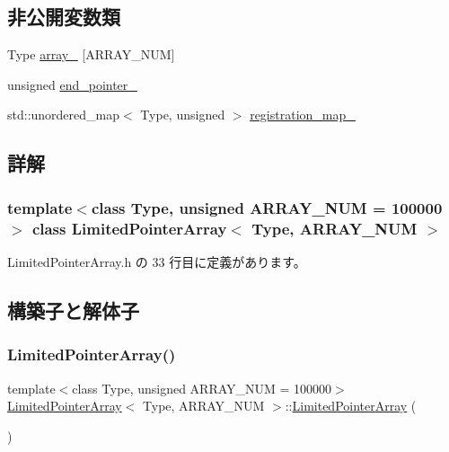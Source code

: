 \subsection*{非公開変数類}
\begin{DoxyCompactItemize}
\item 
Type \mbox{\hyperlink{class_limited_pointer_array_a80e958d7818fc6ee0e757b56abc937a4}{array\+\_\+}} \mbox{[}A\+R\+R\+A\+Y\+\_\+\+N\+UM\mbox{]}
\item 
unsigned \mbox{\hyperlink{class_limited_pointer_array_a7da38a8f2ea9a4b030f64f0e8adc27e8}{end\+\_\+pointer\+\_\+}}
\item 
std\+::unordered\+\_\+map$<$ Type, unsigned $>$ \mbox{\hyperlink{class_limited_pointer_array_a4f3ca120f5fc23ee3db798cb701d61a0}{registration\+\_\+map\+\_\+}}
\end{DoxyCompactItemize}


\subsection{詳解}
\subsubsection*{template$<$class Type, unsigned A\+R\+R\+A\+Y\+\_\+\+N\+UM = 100000$>$\newline
class Limited\+Pointer\+Array$<$ Type, A\+R\+R\+A\+Y\+\_\+\+N\+U\+M $>$}



 Limited\+Pointer\+Array.\+h の 33 行目に定義があります。



\subsection{構築子と解体子}
\mbox{\label{class_limited_pointer_array_acab3e47d77fcd7ed7735a735e1aaf8f9}} 
\subsubsection{\texorpdfstring{Limited\+Pointer\+Array()}{LimitedPointerArray()}}
{\footnotesize\ttfamily template$<$class Type, unsigned A\+R\+R\+A\+Y\+\_\+\+N\+UM = 100000$>$ \\
\mbox{\hyperlink{class_limited_pointer_array}{Limited\+Pointer\+Array}}$<$ Type, A\+R\+R\+A\+Y\+\_\+\+N\+UM $>$\+::\mbox{\hyperlink{class_limited_pointer_array}{Limited\+Pointer\+Array}} (\begin{DoxyParamCaption}{ }\end{DoxyParamCaption})\hspace{0.3cm}{\ttfamily [inline]}}



